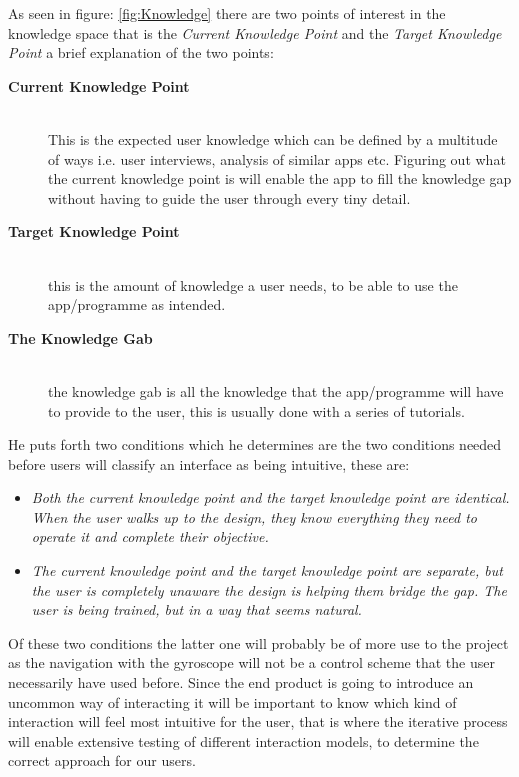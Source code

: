 As seen in figure: \ref{fig:Knowledge} there are two points of interest in the knowledge space that is the \textit{Current Knowledge Point} and the \textit{Target Knowledge Point} a brief explanation of the two points:
\begin{description}
 \item[\textbf{Current Knowledge Point}] \hfill\\
 This is the expected user knowledge which can be defined by a multitude of ways i.e. user interviews, analysis of similar apps etc. Figuring out what the current knowledge point is will enable the app to fill the knowledge gap without having to guide the user through every tiny detail. 
\item[\textbf{Target Knowledge Point}]\hfill\\
this is the amount of knowledge a user needs, to be able to use the app/programme as intended.
\item[\textbf{The Knowledge Gab}]\hfill\\
the knowledge gab is all the knowledge that the app/programme will have to provide to the user, this is usually done with a series of tutorials. 
\end{description}

He puts forth two conditions which he determines are the two conditions needed before users will classify an interface as being intuitive, these are:
\begin{itemize}
\item \textit{Both the current knowledge point and the target knowledge point are identical. When the user walks up to the design, they know everything they need to operate it and complete their objective.}
\item \textit{The current knowledge point and the target knowledge point are separate, but the user is completely unaware the design is helping them bridge the gap. The user is being trained, but in a way that seems natural.}
\end{itemize} 
Of these two conditions the latter one will probably be of more use to the project as the navigation with the gyroscope will not be a control scheme that the user necessarily  have used before. Since the end product is going to introduce an uncommon way of interacting it will be important to know which kind of interaction will feel most intuitive for the user, that is where the iterative process will enable extensive testing of different interaction models, to determine the correct approach for our users.
